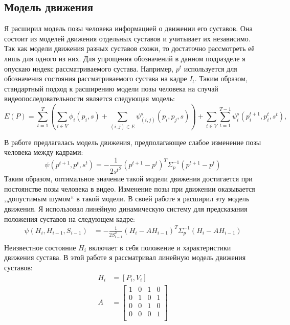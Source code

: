 \subsection{Модель движения}

Я расширил модель позы человека информацией о движении его суставов. Она состоит из моделей движения отдельных суставов и учитывает их независимо. Так как модели движения разных суставов схожи, то достаточно рассмотреть её лишь для одного из них. Для упрощения обозначений в данном подразделе я опускаю индекс рассматриваемого сустава. Например, $p^t$ используется для обозначения состояния рассматриваемого сустава на кадре $I_t$. Таким образом, стандартный подход к расширению модели позы человека на случай видеопоследовательности является следующая модель:
\begin{equation}
	E(P) = \sum_{t=1}^T\left(\sum_{i\in V}{\phi_i(p_i, s)} + \sum_{\left(i,j\right)\in E}{\psi_{(i,j)}^s(p_i, p_j, s)}\right) + \sum_{i\in V}\sum_{t=1}^{T-1}\psi_i^s(p_i^{t+1}, p_i^t, s^t),
\end{equation}

В работе \cite{park2011n} предлагалась модель движения, предполагающее слабое изменение позы человека между кадрами:
\begin{equation*}
	\psi(p^{t+1}, p^t, s^t) = -\frac{1} {2 {s^t}^2}(p^{t+1} - p^t)^T \Sigma_p^{-1} (p^{t+1} - p^t)
\end{equation*}
Таким образом, оптимальное значение такой модели движения достигается при постоянстве позы человека в видео. Изменение позы при движении оказывается ,,допустимым шумом`` в такой модели. В своей работе я расширил эту модель движения. Я использовал линейную динамическую систему для предсказания положения суставов на следующем кадре:
\begin{equation}
	\begin{aligned}
		\psi(H_i, H_{i-1}, S_{i-1}) &=
			-\frac{1}{2 S_{i-1}^2} (H_i - A H_{i-1})^T \Sigma_p^{-1} (H_i - A H_{i-1}) \\
	\end{aligned}
\end{equation}
Неизвестное состояние $H_i$ включает в себя положение и характеристики движения сустава. В этой работе я рассматривал линейную модель движения суставов:
\begin{equation}
	\begin{aligned}
		H_i &= \left[P_i, V_i\right] \\
		A &=
			\begin{bmatrix}
			1 & 0 & 1 & 0 \\
			0 & 1 & 0 & 1 \\
			0 & 0 & 1 & 0 \\
			0 & 0 & 0 & 1 \\
			\end{bmatrix} \\
	\end{aligned}
\end{equation}

